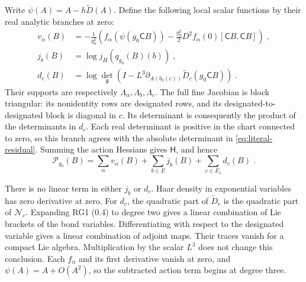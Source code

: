 \documentclass[11pt]{article}
\begin{document}
Write $\psi(A)=A-h\widetilde D(A)$. Define the following local scalar functions by their real analytic branches at zero:
\begin{equation}\label{eq:perimeter-literal-local-terms}
    \begin{aligned}
        v_\alpha(B)&=-\frac{1}{g_0^2}
            \left(f_\alpha(\psi(g_0\mathsf CB))
                -\frac{g_0^2}{2}
                    D^2f_\alpha(0)[\mathsf CB,\mathsf CB]\right)\;,\\
        j_b(B)&=\log j_H(q_{g_0}(B)(b))\;,\\
        d_c(B)&=\log\det_{\mathfrak g}
            \left(I-L^3\partial_{A(b_0(c))}
                \widetilde D_c(g_0\mathsf CB)\right)\;.
    \end{aligned}
\end{equation}
Their supports are respectively $\Lambda_\alpha,\Lambda_b,\Lambda_c$. The full fine Jacobian is block triangular: its nonidentity rows are designated rows, and its designated-to-designated block is diagonal in $c$. Its determinant is consequently the product of the determinants in $d_c$. Each real determinant is positive in the chart connected to zero, so this branch agrees with the absolute determinant in \eqref{eq:literal-residual}. Summing the action Hessians gives $\mathsf H$, and hence
\begin{equation}\label{eq:perimeter-literal-local-sum}
    \mathcal P_{g_0}(B)
        =\sum_\alpha v_\alpha(B)+\sum_{b\in E}j_b(B)
            +\sum_{c\in E_1}d_c(B)\;.
\end{equation}


There is no linear term in either $j_b$ or $d_c$. Haar density in exponential variables has zero derivative at zero. For $d_c$, the quadratic part of $\widetilde D_c$ is the quadratic part of $\mathcal N_c$. Expanding RG1 (0.4) to degree two gives a linear combination of Lie brackets of the bond variables. Differentiating with respect to the designated variable gives a linear combination of adjoint maps. Their traces vanish for a compact Lie algebra. Multiplication by the scalar $L^3$ does not change this conclusion. Each $f_\alpha$ and its first derivative vanish at zero, and $\psi(A)=A+O(A^2)$, so the subtracted action term begins at degree three.
\end{document}
